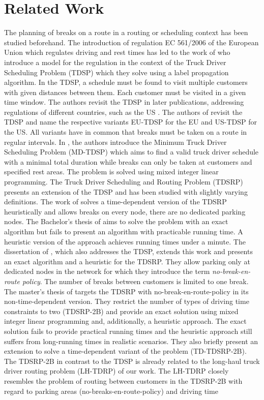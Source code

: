 
\chapter{Related Work\label{ch:related_work}}
The planning of breaks on a route in a routing or scheduling context has been studied beforehand. The introduction of regulation EC 561/2006 of the European Union \cite{europeanparliament:2006} which regulates driving and rest times has led to the work of \cite{goel:2009} who introduce a model for the regulation in the context of the Truck Driver Scheduling Problem (TDSP) which they solve using a label propagation algorithm. In the TDSP, a schedule must be found to visit multiple customers with given distances between them. Each customer must be visited in a given time window. The authors revisit the TDSP in later publications, addressing regulations of different countries, such as the US \cite{goel:2012}. The authors of \cite{sartori:2021} revisit the TDSP and name the respective variants EU-TDSP for the EU and US-TDSP for the US. All variants have in common that breaks must be taken on a route in regular intervals. In \cite{goel:2012b}, the authors introduce the Minimum Truck Driver Scheduling Problem (MD-TDSP) which aims to find a valid truck driver schedule with a minimal total duration while breaks can only be taken at customers and specified rest areas. The problem is solved using mixed integer linear programming. The Truck Driver Scheduling and Routing Problem (TDSRP) presents an extension of the TDSP and has been studied with slightly varying definitions. The work of \cite{shah:2008} solves a time-dependent version of the TDSRP heuristically and allows breaks on every node, there are no dedicated parking nodes. The Bachelor's thesis of \cite{braeuer:2016} aims to solve the problem with an exact algorithm but fails to present an algorithm with practicable running time. A heuristic version of the approach achieves running times under a minute. The dissertation of \cite{kleff:2019}, which also addresses the TDSP, extends this work and presents an exact algorithm and a heuristic for the TDSRP. They allow parking only at dedicated nodes in the network for which they introduce the term \emph{no-break-en-route policy}. The number of breaks between customers is limited to one break. The master's thesis of \cite{bomsdorf:2020} targets the TDSRP with no-break-en-route-policy in its non-time-dependent version. They restrict the number of types of driving time constraints to two (TDSRP-2B) and provide an exact solution using mixed integer linear programming and, additionally, a heuristic approach. The exact solution fails to provide practical running times and the heuristic approach still suffers from long-running times in realistic scenarios. They also briefly present an extension to solve a time-dependent variant of the problem (TD-TDSRP-2B). The TDSRP-2B in contrast to the TDSP is already related to the long-haul truck driver routing problem (LH-TDRP) of our work. The LH-TDRP closely resembles the problem of routing between customers in the TDSRP-2B with regard to parking areas (no-breaks-en-route-policy) and driving time 